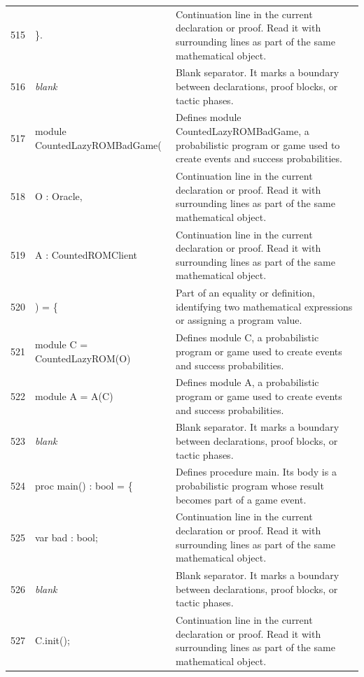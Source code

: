 \documentclass[10pt]{article}
\begin{document}
\begin{longtable}{r L{0.53\textwidth} L{0.37\textwidth}}
515 & {\ttfamily\scriptsize \}.} & Continuation line in the current declaration or proof.  Read it with surrounding lines as part of the same mathematical object. \\
516 & {\ttfamily\scriptsize \emph{blank}} & Blank separator.  It marks a boundary between declarations, proof blocks, or tactic phases. \\
517 & {\ttfamily\scriptsize module CountedLazyROMBadGame(} & Defines module CountedLazyROMBadGame, a probabilistic program or game used to create events and success probabilities. \\
518 & {\ttfamily\scriptsize   O : Oracle,} & Continuation line in the current declaration or proof.  Read it with surrounding lines as part of the same mathematical object. \\
519 & {\ttfamily\scriptsize   A : CountedROMClient} & Continuation line in the current declaration or proof.  Read it with surrounding lines as part of the same mathematical object. \\
520 & {\ttfamily\scriptsize ) = \{} & Part of an equality or definition, identifying two mathematical expressions or assigning a program value. \\
521 & {\ttfamily\scriptsize   module C = CountedLazyROM(O)} & Defines module C, a probabilistic program or game used to create events and success probabilities. \\
522 & {\ttfamily\scriptsize   module A = A(C)} & Defines module A, a probabilistic program or game used to create events and success probabilities. \\
523 & {\ttfamily\scriptsize \emph{blank}} & Blank separator.  It marks a boundary between declarations, proof blocks, or tactic phases. \\
524 & {\ttfamily\scriptsize   proc main() : bool = \{} & Defines procedure main.  Its body is a probabilistic program whose result becomes part of a game event. \\
525 & {\ttfamily\scriptsize     var bad : bool;} & Continuation line in the current declaration or proof.  Read it with surrounding lines as part of the same mathematical object. \\
526 & {\ttfamily\scriptsize \emph{blank}} & Blank separator.  It marks a boundary between declarations, proof blocks, or tactic phases. \\
527 & {\ttfamily\scriptsize     C.init();} & Continuation line in the current declaration or proof.  Read it with surrounding lines as part of the same mathematical object. \\

\end{longtable}
\end{document}
